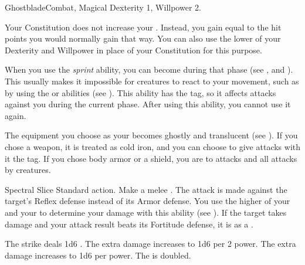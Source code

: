   \begin{magicalfeat}{Ghostblade}{Combat, Magical}
    \featpre Dexterity 1, Willpower 2.

     Your Constitution does not increase your .
    Instead, you gain  equal to the hit points you would normally gain that way.
    You can also use the lower of your Dexterity and Willpower in place of your Constitution for this purpose.

     When you use the \textit{sprint} ability, you can become  during that phase (see , and ).
    This usually makes it impossible for creatures to react to your movement, such as by using the  or  abilities (see ).
    This ability has the  tag, so it affects attacks against you during the current phase.
    After using this ability, you  cannot use it again.

     The equipment you choose as your  becomes ghostly and translucent (see ).
    If you chose a weapon, it is treated as cold iron, and you can choose to give attacks with it the \atCold tag.
    If you chose body armor or a shield, you are  to \atCold attacks and all attacks by  creatures.

    \begin{magicalactiveability}{Spectral Slice}
      \abilityusagetime Standard action.
      \rankline
      Make a melee .
      The attack is made against the target's Reflex defense instead of its Armor defense.
      You use the higher of your  and your  to determine your damage with this ability (see ).
      \hit If the target takes damage and your attack result beats its Fortitude defense, it is \slowed as a .

      \rankline
       The strike deals 1d6 .
       The extra damage increases to 1d6  per 2 power.
       The extra damage increases to 1d6  per power.
       The  is doubled.
    \end{magicalactiveability}


\end{magicalfeat}
